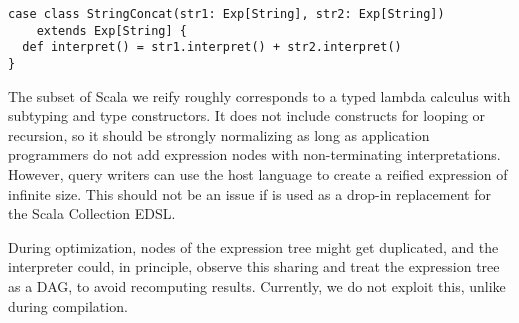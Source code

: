 \begin{lstlisting}
case class StringConcat(str1: Exp[String], str2: Exp[String])
    extends Exp[String] {
  def interpret() = str1.interpret() + str2.interpret()
}
\end{lstlisting}

The subset of Scala we reify roughly corresponds to a typed lambda calculus with subtyping and type constructors. It does not include constructs for looping or recursion, so it should be strongly normalizing as long as application programmers do not add expression nodes with non-terminating interpretations. However, query writers can use the host language to create a reified expression of infinite size. This should not be an issue if {\LoS} is used as a drop-in replacement for the Scala Collection EDSL\@.

During optimization, nodes of the expression tree might get duplicated, and the
interpreter could, in principle, observe this sharing and treat the expression
tree as a DAG, to avoid recomputing results. Currently, we do not exploit this,
unlike during compilation.


